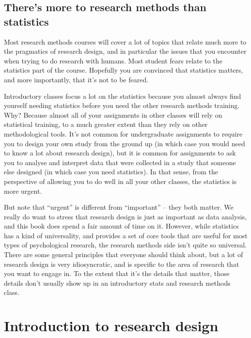 \documentclass[
  11pt,
]{book}
\theoremstyle{definition}
\theoremstyle{definition}
\theoremstyle{definition}
\theoremstyle{definition}
\theoremstyle{remark}
\begin{document}
\hypertarget{theres-more-to-research-methods-than-statistics}{%
\section{There's more to research methods than statistics}\label{theres-more-to-research-methods-than-statistics}}

Most research methods courses will cover a lot of topics that relate much more to the pragmatics of research design, and in particular the issues that you encounter when trying to do research with humans. Most student fears relate to the statistics part of the course. Hopefully you are convinced that statistics matters, and more importantly, that it's not to be feared.

Introductory classes focus a lot on the statistics because you almost always find yourself needing statistics before you need the other research methods training. Why? Because almost all of your assignments in other classes will rely on statistical training, to a much greater extent than they rely on other methodological tools. It's not common for undergraduate assignments to require you to design your own study from the ground up (in which case you would need to know a lot about research design), but it is common for assignments to ask you to analyse and interpret data that were collected in a study that someone else designed (in which case you need statistics). In that sense, from the perspective of allowing you to do well in all your other classes, the statistics is more urgent.

But note that ``urgent'' is different from ``important'' -- they both matter. We really do want to stress that research design is just as important as data analysis, and this book does spend a fair amount of time on it. However, while statistics has a kind of universality, and provides a set of core tools that are useful for most types of psychological research, the research methods side isn't quite so universal. There are some general principles that everyone should think about, but a lot of research design is very idiosyncratic, and is specific to the area of research that you want to engage in. To the extent that it's the details that matter, those details don't usually show up in an introductory stats and research methods class.

\hypertarget{researchdesign}{%
\chapter{Introduction to research design}\label{researchdesign}}
\end{document}
